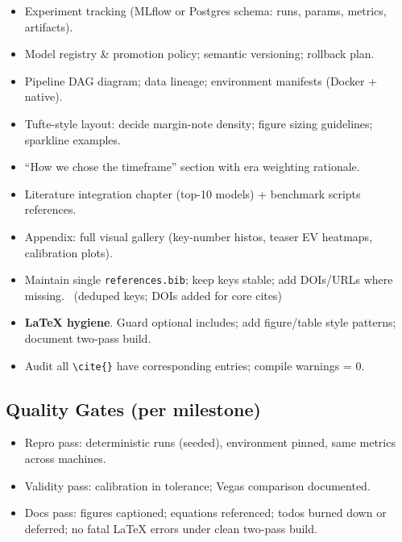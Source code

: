 \begin{itemize}
  \item {} Experiment tracking (MLflow or Postgres schema: runs, params, metrics, artifacts).
  \item {} Model registry \& promotion policy; semantic versioning; rollback plan.
  \item {} Pipeline DAG diagram; data lineage; environment manifests (Docker + native).
\end{itemize}

\begin{itemize}
  \item {} Tufte-style layout: decide margin-note density; figure sizing guidelines; sparkline examples.
  \item {} “How we chose the timeframe” section with era weighting rationale.
  \item {} Literature integration chapter (top-10 models) + benchmark scripts references.
  \item {} Appendix: full visual gallery (key-number histos, teaser EV heatmaps, calibration plots).
\end{itemize}

\begin{itemize}
  \item {} Maintain single \texttt{references.bib}; keep keys stable; add DOIs/URLs where missing. \done\ (deduped keys; DOIs added for core cites)
  \item {} \textbf{LaTeX hygiene}. Guard optional includes; add figure/table style patterns; document two‑pass build. \done
  \item {} Audit all \texttt{\textbackslash cite\{\}} have corresponding entries; compile warnings = 0.
\end{itemize}

\subsection*{Quality Gates (per milestone)}
\begin{itemize}
  \item Repro pass: deterministic runs (seeded), environment pinned, same metrics across machines.
  \item Validity pass: calibration in tolerance; Vegas comparison documented.
  \item Docs pass: figures captioned; equations referenced; todos burned down or deferred; no fatal LaTeX errors under clean two‑pass build.
\end{itemize}

